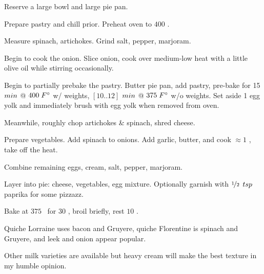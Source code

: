 \begin{preparation}
\item Reserve a large bowl and large pie pan.

\item Prepare pastry and chill prior.
	Preheat oven to $400$ \Fahrenheit.

\item Measure spinach, artichokes. Grind salt, pepper, marjoram.

\item Begin to cook the onion.
	Slice onion, cook over medium-low heat with a little olive oil while stirring occasionally.

\item Begin to partially prebake the pastry.
	Butter pie pan, add pastry, pre-bake for 15 $\minute$ @ $400\;\Fahrenheit$ w/ weights, $[10..12]$  $\minute$ @ $375\;\Fahrenheit$ w/o weights.
	Set aside 1 egg yolk and immediately brush with egg yolk when removed from oven.

\item Meanwhile, roughly chop artichokes \& spinach, shred cheese.

\item Prepare vegetables.
	Add spinach to onions.
	Add garlic, butter, and cook $\approx 1$ \minute, take off the heat.

\item Combine remaining eggs, cream, salt, pepper, marjoram.

\item Layer into pie: cheese, vegetables, egg mixture.
	Optionally garnish with $\onehalf$ $\teaspoon$ paprika for some pizzazz.

\item Bake at $375$ \Fahrenheit~for $30$ \minute, broil briefly, rest $10$ \minute.
\end{preparation}


\begin{variation}
\item Quiche Lorraine uses bacon and Gruyere, quiche Florentine is spinach and Gruyere, and leek and onion appear popular.

\item Other milk varieties are available but heavy cream will make the best texture in my humble opinion.
\end{variation}


\recipeend
